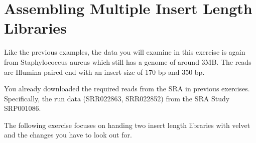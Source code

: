 \section{Assembling Multiple Insert Length Libraries}

\begin{note}
Like the previous examples, the data you will examine in this exercise is again
from Staphylococcus aureus which still has a genome of around 3MB. The reads are
Illumina paired end with an insert size of 170 bp and 350 bp.

You already downloaded the required reads from the SRA in previous exercises.
Specifically, the run data (SRR022863, SRR022852) from the SRA Study SRP001086.

\end{note}

\begin{information}
The following exercise focuses on handing two insert length libraries with
velvet and the changes you have to look out for.
\end{information}

